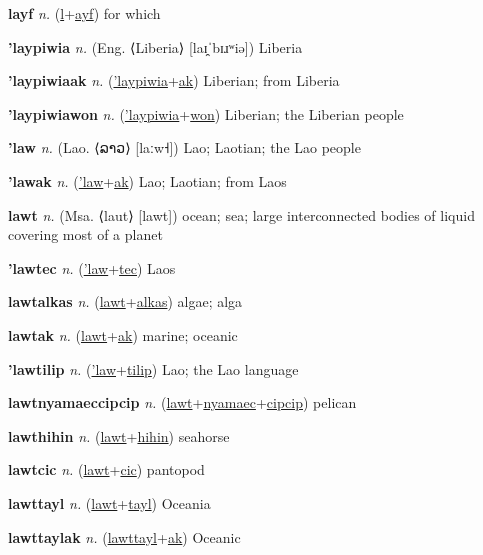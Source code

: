 \textbf{\hypertarget{layf}{layf}} \textit{n.} (\hyperlink{l}{l}+\allowbreak \hyperlink{ayf}{ayf})
for which

\textbf{\hypertarget{'laypiwia}{'laypiwia}} \textit{n.} (Eng. ⟨Liberia⟩ [laɪ̯ˈbɪɹʷiə])
Liberia

\textbf{\hypertarget{'laypiwiaak}{'laypiwiaak}} \textit{n.} (\hyperlink{'laypiwia}{'laypiwia}+\allowbreak \hyperlink{ak}{ak})
Liberian; from Liberia

\textbf{\hypertarget{'laypiwiawon}{'laypiwiawon}} \textit{n.} (\hyperlink{'laypiwia}{'laypiwia}+\allowbreak \hyperlink{won}{won})
Liberian; the Liberian people

\textbf{\hypertarget{'law}{'law}} \textit{n.} (Lao. ⟨{\lao{}ລາວ}⟩ [laːw˧])
Lao; Laotian; the Lao people

\textbf{\hypertarget{'lawak}{'lawak}} \textit{n.} (\hyperlink{'law}{'law}+\allowbreak \hyperlink{ak}{ak})
Lao; Laotian; from Laos

\textbf{\hypertarget{lawt}{lawt}} \textit{n.} (Msa. ⟨laut⟩ [lawt])
ocean; sea; large interconnected bodies of liquid covering most of a planet

\textbf{\hypertarget{'lawtec}{'lawtec}} \textit{n.} (\hyperlink{'law}{'law}+\allowbreak \hyperlink{tec}{tec})
Laos

\textbf{\hypertarget{lawtalkas}{lawtalkas}} \textit{n.} (\hyperlink{lawt}{lawt}+\allowbreak \hyperlink{alkas}{alkas})
algae; alga

\textbf{\hypertarget{lawtak}{lawtak}} \textit{n.} (\hyperlink{lawt}{lawt}+\allowbreak \hyperlink{ak}{ak})
marine; oceanic

\textbf{\hypertarget{'lawtilip}{'lawtilip}} \textit{n.} (\hyperlink{'law}{'law}+\allowbreak \hyperlink{tilip}{tilip})
Lao; the Lao language

\textbf{\hypertarget{lawtnyamaeccipcip}{lawtnyamaeccipcip}} \textit{n.} (\hyperlink{lawt}{lawt}+\allowbreak \hyperlink{nyamaec}{nyamaec}+\allowbreak \hyperlink{cipcip}{cipcip})
pelican

\textbf{\hypertarget{lawthihin}{lawthihin}} \textit{n.} (\hyperlink{lawt}{lawt}+\allowbreak \hyperlink{hihin}{hihin})
seahorse

\textbf{\hypertarget{lawtcic}{lawtcic}} \textit{n.} (\hyperlink{lawt}{lawt}+\allowbreak \hyperlink{cic}{cic})
pantopod

\textbf{\hypertarget{lawttayl}{lawttayl}} \textit{n.} (\hyperlink{lawt}{lawt}+\allowbreak \hyperlink{tayl}{tayl})
Oceania

\textbf{\hypertarget{lawttaylak}{lawttaylak}} \textit{n.} (\hyperlink{lawttayl}{lawttayl}+\allowbreak \hyperlink{ak}{ak})
Oceanic

